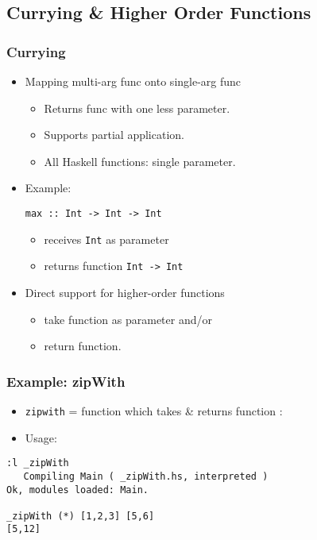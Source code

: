 \subsection{Currying \& Higher Order Functions}

\begin{frame}[fragile]
  \frametitle{Currying}
  \begin{itemize}
    \item Mapping multi-arg func onto single-arg func 
      \begin{itemize}
        \item Returns func with one less parameter.
        \item Supports partial application.
        \item All Haskell functions: single parameter.
      \end{itemize}
    \item Example:
\begin{lstlisting}    
max :: Int -> Int -> Int
\end{lstlisting}
      \begin{itemize}
        \item receives {\scriptsize \verb+Int+} as parameter
        \item returns function {\scriptsize \verb+Int -> Int+}
      \end{itemize}    
    \item Direct support for higher-order functions
      \begin{itemize}
        \item take function as parameter and/or
        \item return function.
      \end{itemize}     
  \end{itemize}
\end{frame}

\begin{frame}[fragile]
  \frametitle{Example: zipWith}

  \begin{itemize}
    \item \texttt{zipwith} = function which takes \& returns function :
  \end{itemize}

  
  \begin{itemize}
    \item Usage:
  \end{itemize}
 \begin{lstlisting}
:l _zipWith
   Compiling Main ( _zipWith.hs, interpreted )
Ok, modules loaded: Main.

_zipWith (*) [1,2,3] [5,6]
[5,12]  
\end{lstlisting}
  
\end{frame}